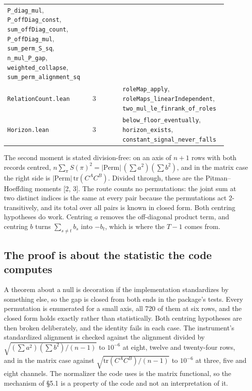 \documentclass[10pt,letterpaper,twocolumn]{article}
\begin{document}
\begin{center}
{\begin{xtabular}{L{0.372\linewidth}L{0.138\linewidth}L{0.386\linewidth}}
\texttt{P\_\allowbreak{}diag\_\allowbreak{}mul},
\texttt{P\_\allowbreak{}offDiag\_\allowbreak{}const},
\texttt{sum\_\allowbreak{}offDiag\_\allowbreak{}count},
\texttt{P\_\allowbreak{}offDiag\_\allowbreak{}mul},
\texttt{sum\_\allowbreak{}perm\_\allowbreak{}S\_\allowbreak{}sq},
\texttt{n\_\allowbreak{}mul\_\allowbreak{}P\_\allowbreak{}gap},
\texttt{weighted\_\allowbreak{}collapse},
\texttt{sum\_\allowbreak{}perm\_\allowbreak{}alignment\_\allowbreak{}sq} \\
\texttt{RelationCount.\allowbreak{}lean} & 3 & \texttt{roleMap\_\allowbreak{}apply},
\texttt{roleMaps\_\allowbreak{}linearIndependent},
\texttt{two\_\allowbreak{}mul\_\allowbreak{}le\_\allowbreak{}finrank\_\allowbreak{}of\_\allowbreak{}roles} \\
\texttt{Horizon.\allowbreak{}lean} & 3 & \texttt{below\_\allowbreak{}floor\_\allowbreak{}eventually},
\texttt{horizon\_\allowbreak{}exists},
\texttt{constant\_\allowbreak{}signal\_\allowbreak{}never\_\allowbreak{}falls} \\
\end{xtabular}
}
\end{center}

The second moment is stated division-free: on an axis of \(n + 1\) rows with both records centred,
\(n \sum_\pi S(\pi)^2 = |\mathrm{Perm}| \, (\sum a^2)(\sum b^2)\), and in the matrix case the right
side is \(|\mathrm{Perm}| \, \mathrm{tr}(C^A C^B)\). Divided through, these are the Pitman--Hoeffding
moments {[}2, 3{]}. The route counts no permutations: the joint sum at two distinct indices is the same
at every pair because the permutations act 2-transitively, and its total over all pairs is known in
closed form. Both centring hypotheses do work. Centring \(a\) removes the off-diagonal product term, and
centring \(b\) turns \(\sum_{s \ne t} b_s\) into \(-b_t\), which is where the \(T - 1\) comes from.

\subsection{The proof is about the statistic the code computes}\label{the-proof-is-about-the-statistic-the-code-computes}

A theorem about a null is decoration if the implementation standardizes by something else, so the gap
is closed from both ends in the package's tests. Every permutation is enumerated for a small axis, all
720 of them at six rows, and the closed form holds exactly rather than statistically. Both centring
hypotheses are then broken deliberately, and the identity fails in each case. The instrument's
standardized alignment is checked against the alignment divided by
\(\sqrt{(\sum a^2)(\sum b^2)/(n - 1)}\) to \(10^{-6}\) at eight, twelve and twenty-four rows, and in the
matrix case against \(\sqrt{\mathrm{tr}(C^A C^B)/(n - 1)}\) to \(10^{-6}\) at three, five and eight
channels. The normalizer the code uses is the matrix functional, so the mechanism of §5.1 is a
property of the code and not an interpretation of it.
\end{document}
